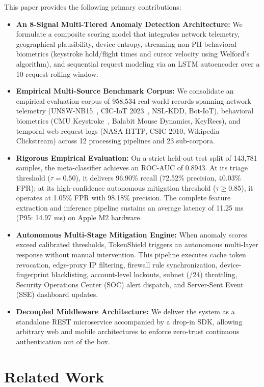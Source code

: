 \documentclass[conference]{IEEEtran}
\begin{document}
This paper provides the following primary contributions:
\begin{itemize}
    \item \textbf{An 8-Signal Multi-Tiered Anomaly Detection Architecture:} We formulate a composite scoring model that integrates network telemetry, geographical plausibility, device entropy, streaming non-PII behavioral biometrics (keystroke hold/flight times and cursor velocity using Welford's algorithm), and sequential request modeling via an LSTM autoencoder over a 10-request rolling window.
    \item \textbf{Empirical Multi-Source Benchmark Corpus:} We consolidate an empirical evaluation corpus of 958,534 real-world records spanning network telemetry (UNSW-NB15~\cite{ref5}, CIC-IoT 2023~\cite{ref13}, NSL-KDD, Bot-IoT), behavioral biometrics (CMU Keystroke~\cite{ref11}, Balabit Mouse Dynamics, KeyRecs), and temporal web request logs (NASA HTTP, CSIC 2010, Wikipedia Clickstream) across 12 processing pipelines and 23 sub-corpora.
    \item \textbf{Rigorous Empirical Evaluation:} On a strict held-out test split of 143,781 samples, the meta-classifier achieves an ROC-AUC of 0.8943. At its triage threshold ($\tau = 0.50$), it delivers 96.90\% recall (72.52\% precision, 40.03\% FPR); at its high-confidence autonomous mitigation threshold ($\tau \ge 0.85$), it operates at 1.05\% FPR with 98.18\% precision. The complete feature extraction and inference pipeline sustains an average latency of 11.25 ms (P95: 14.97 ms) on Apple M2 hardware.
    \item \textbf{Autonomous Multi-Stage Mitigation Engine:} When anomaly scores exceed calibrated thresholds, TokenShield triggers an autonomous multi-layer response without manual intervention. This pipeline executes cache token revocation, edge-proxy IP filtering, firewall rule synchronization, device-fingerprint blacklisting, account-level lockouts, subnet (/24) throttling, Security Operations Center (SOC) alert dispatch, and Server-Sent Event (SSE) dashboard updates.
    \item \textbf{Decoupled Middleware Architecture:} We deliver the system as a standalone REST microservice accompanied by a drop-in SDK, allowing arbitrary web and mobile architectures to enforce zero-trust continuous authentication out of the box.
\end{itemize}

\section{Related Work}
\end{document}
